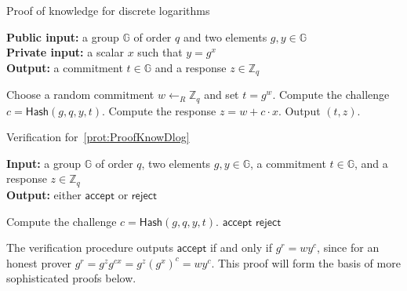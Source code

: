 \documentclass[12pt,a4paper]{article}
\theoremstyle{definition}
\begin{document}
\begin{algorithm}\caption{Proof of knowledge for discrete logarithms}\label{prot:ProofKnowDlog}
    \textbf{Public input:} a group $\mathbb{G}$ of order $q$ and two elements $g, y\in\mathbb{G}$\\
    \textbf{Private input:} a scalar $x$ such that $y = g^x$\\
    \textbf{Output:} a commitment $t\in\mathbb{G}$ and a response $z\in\mathbb{Z}_q$
    \begin{algorithmic}[1]
        \State Choose a random commitment $w\leftarrow_R\mathbb{Z}_q$ and set $t = g^w$.
        \State Compute the challenge $c=\mathsf{Hash}(g, q, y, t)$.
        \State Compute the response $z=w+c\cdot x$.
        \State Output $(t, z)$.
    \end{algorithmic}
\end{algorithm}
\begin{algorithm}\caption{Verification for~\ref{prot:ProofKnowDlog}}
    \textbf{Input:} a group $\mathbb{G}$ of order $q$, two elements $g, y\in\mathbb{G}$, a commitment $t\in\mathbb{G}$, and a response $z\in\mathbb{Z}_q$\\
    \textbf{Output:} either $\mathsf{accept}$ or $\mathsf{reject}$
    \begin{algorithmic}[1]
        \State Compute the challenge $c=\mathsf{Hash}(g, q, y, t)$.
            \State \Return $\mathsf{accept}$
        \Else
            \State \Return $\mathsf{reject}$
        \EndIf
    \end{algorithmic}
\end{algorithm}
The verification procedure outputs $\mathsf{accept}$ if and only if $g^r=wy^c$, since for an honest prover $g^r=g^zg^{cx}=g^z(g^x)^c=wy^c$. This proof will form the basis of more sophisticated proofs below.
\end{document}
